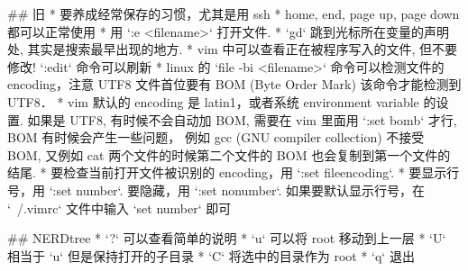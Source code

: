 ## 旧
* 要养成经常保存的习惯，尤其是用 ssh
* home, end, page up, page down 都可以正常使用
* 用 `:e <filename>` 打开文件.
* `gd` 跳到光标所在变量的声明处, 其实是搜索最早出现的地方.
* vim 中可以查看正在被程序写入的文件, 但不要修改! `:edit` 命令可以刷新
* linux 的 `file -bi <filename>` 命令可以检测文件的 encoding，注意 UTF8 文件首位要有 BOM (Byte Order Mark) 该命令才能检测到 UTF8．
* vim 默认的 encoding 是 latin1，或者系统 environment variable 的设置. 如果是 UTF8, 有时候不会自动加 BOM, 需要在 vim 里面用 `:set bomb` 才行, BOM 有时候会产生一些问题， 例如 gcc (GNU compiler collection) 不接受 BOM, 又例如 cat 两个文件的时候第二个文件的 BOM 也会复制到第一个文件的结尾.
* 要检查当前打开文件被识别的 encoding，用 `:set fileencoding`.
* 要显示行号，用 `:set number`. 要隐藏，用 `:set nonumber`. 如果要默认显示行号，在 `~/.vimrc` 文件中输入 `set number` 即可

## NERDtree
* `?` 可以查看简单的说明
* `u` 可以将 root 移动到上一层
* `U` 相当于 `u` 但是保持打开的子目录
* `C` 将选中的目录作为 root
* `q` 退出
